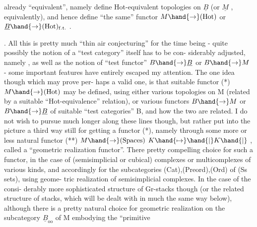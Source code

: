 already ``equivalent'', namely define Hot-equivalent topologies on $\underline{B}$ (or 
$\underline{M}$ , equivalently), and hence define ``the same'' functor $M \hand{\to} (\mathrm{Hot})$ or
$\underline{B} \hand{\to} (\mathrm{Hot})_{\mathrm{f.t.}}$ .

.  All this is pretty much ``thin air conjecturing'' for the time being
- quite possibly the notion of a ``test category'' itself has to be con-%
siderably adjusted, namely , as well as the notion of 
``test functor'' $B \hand{\to} \underline{B}$ or $B \hand{\to} M$ -  some important features  have
entirely escaped my attention. The one idea though which may prove per-%
haps a valid one, is that  suitable  functor
(*) \qquad $M \hand{\to} (\mathrm{Hot})$
may be defined, using either various topologies on M (related by a
suitable ``Hot-equivalence'' relation), or various functors $B \hand{\to} M$ or
$B \hand{\to} \underline{B}$ of suitable ``test categories'' B, and how the two are related.
I do not wish to pursue much longer along these lines though, but
rather put  into the picture a third way still for getting a functor
(*), namely through some more or less natural functor
(**) \qquad $M \hand{\to} (\mathrm{Spaces})$ \hand{,} \qquad $K \hand{\mapsto} \hand{|}K\hand{|}$ ,
called a ``geometric  realization functor''. There  pretty compelling
choice for such a functor, in the case of (semisimplicial or cubical)
complexes or multicomplexes of various kinds, and accordingly for
the subcategories (Cat),(Preord),(Ord) of  (Ss sets), using geome-%
tric realization of semisimplicial complexes. In the case of the consi-%
derably more sophisticated structure of Gr-stacks though (or the related
structure of stacks, which will be dealt with in much the same way
below), although there is a pretty natural choice for geometric
realization on the subcategory $\underline{B}_{\mathrm{oo}}$  of M embodying the ``primitive
